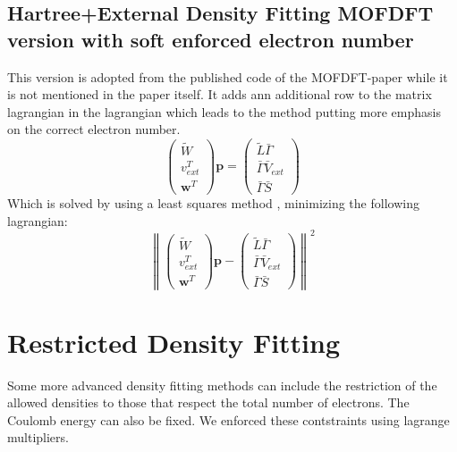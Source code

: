 \subsection{Hartree+External Density Fitting MOFDFT version with soft enforced electron number}
This version is adopted from the published code of the MOFDFT-paper\cite{zhang_m-ofdft_2023}  while it is not mentioned in the paper itself. It adds ann additional row to the matrix lagrangian in the lagrangian which leads to the method putting more emphasis on the correct electron number.
\begin{equation}
    \left(\begin{array}{c}\tilde{W}\\v_{ext}^T\\\mathbf{w}^T\end{array}\right) \mathbf{p} =  \left(\begin{array}{c}\tilde{L} \bar{\Gamma} \\ \bar{\Gamma}\bar{V}_{ext}\\\bar{\Gamma}\bar S\end{array}\right)
\end{equation}
Which is solved by using a least squares method , minimizing the following lagrangian:
\begin{equation}
    \left\lVert
    \left(\begin{array}{c}\tilde{W}\\v_{ext}^T\\\mathbf{w}^T\end{array}\right) \mathbf{p} -  \left(\begin{array}{c}\tilde{L} \bar{\Gamma} \\ \bar{\Gamma}\bar{V}_{ext}\\\bar{\Gamma}\bar S\end{array}\right)
    \right\lVert^2
\end{equation}

\section{Restricted Density Fitting}
Some more advanced density fitting methods can include the restriction of the allowed densities to those that respect the total number of electrons. The Coulomb energy can also be fixed. We enforced these contstraints using lagrange multipliers.

